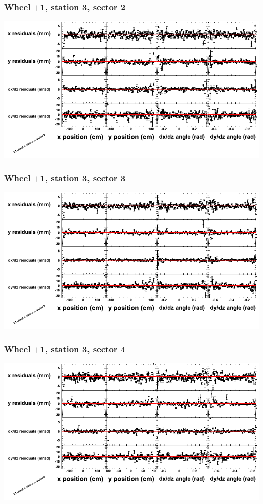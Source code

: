 \documentclass[compress]{beamer}
\begin{document}
\begin{frame}
\frametitle{Wheel $+$1, station 3, sector 2}
\includegraphics[width=\linewidth]{tmppoly_MBwhDst3sec02.png}
\end{frame}

\begin{frame}
\frametitle{Wheel $+$1, station 3, sector 3}
\includegraphics[width=\linewidth]{tmppoly_MBwhDst3sec03.png}
\end{frame}

\begin{frame}
\frametitle{Wheel $+$1, station 3, sector 4}
\includegraphics[width=\linewidth]{tmppoly_MBwhDst3sec04.png}
\end{frame}
\end{document}
